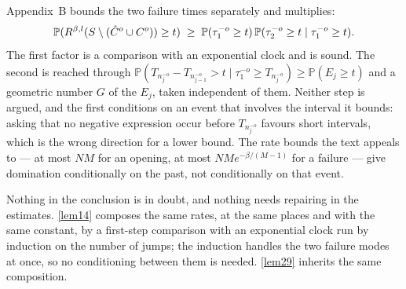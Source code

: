 \begin{remark}
  \label{note-lem14}
  Appendix~B bounds the two failure times separately and multiplies:
  \[
    \mathbb{P}(R^{\beta,l}(S \setminus (\hat{C}^o \cup C^o)) \ge t)
    \;\ge\; \mathbb{P}(\tau_1^{-o} \ge t)\,
      \mathbb{P}(\tau_2^{-o} \ge t \mid \tau_1^{-o} \ge t).
  \]
  The first factor is a comparison with an exponential clock and is sound.  The
  second is reached through
  $\mathbb{P}(T_{n_j^{-o}} - T_{n_{j-1}^{-o}} > t \mid \tau_1^{-o} \ge
  T_{n_j^{-o}}) \ge \mathbb{P}(E_j \ge t)$ and a geometric number $G$ of the
  $E_j$, taken independent of them.  Neither step is argued, and the first
  conditions on an event that involves the interval it bounds: asking that no
  negative expression occur before $T_{n_j^{-o}}$ favours short intervals,
  which is the wrong direction for a lower bound.  The rate bounds the text
  appeals to --- at most $NM$ for an opening, at most $NMe^{-\beta/(M-1)}$ for a
  failure --- give domination conditionally on the past, not conditionally on
  that event.

  Nothing in the conclusion is in doubt, and nothing needs repairing in the
  estimates.  \ref{lem14} composes the same rates, at the same places and with
  the same constant, by a first-step comparison with an exponential clock run
  by induction on the number of jumps; the induction handles the two failure
  modes at once, so no conditioning between them is needed.  \ref{lem29}
  inherits the same composition.
\end{remark}

